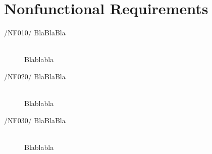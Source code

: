 \section{Nonfunctional Requirements}

\begin{description}
\item[/NF010/ BlaBlaBla]\hfill \\ Blablabla
\item[/NF020/ BlaBlaBla]\hfill \\ Blablabla
\item[/NF030/ BlaBlaBla]\hfill \\ Blablabla
\end{description}